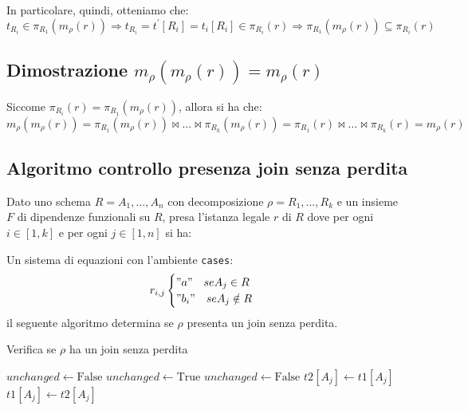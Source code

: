 \documentclass{article}
\begin{document}
In particolare, quindi, otteniamo che:
\[ t_{R_i} \in \pi_{R_1}(m_{\rho}(r)) \Rightarrow t_{R_i} = t^{'}[R_i] = t_i[R_i] \in \pi_{R_i}(r) \Rightarrow \pi_{R_1}(m_{\rho}(r)) \subseteq \pi_{R_i}(r) \]

\subsection{Dimostrazione $m_{\rho}(m_{\rho}(r)) = m_{\rho}(r)$}
Siccome $\pi_{R_i}(r) = \pi_{R_1}(m_{\rho}(r))$, allora si ha che:
\[ m_{\rho}(m_{\rho}(r)) = \pi_{R_1}(m_{\rho}(r)) \bowtie \ldots \bowtie \pi_{R_k}(m_{\rho}(r)) = \pi_{R_1}(r) \bowtie \ldots \bowtie \pi_{R_k}(r) = m_{\rho}(r) \]

\pagebreak

\subsection{Algoritmo controllo presenza join senza perdita}
Dato uno schema $R = A_1, \ldots, A_n$ con decomposizione $\rho = R_1, \ldots, R_k$ e un insieme $F$ di dipendenze funzionali su $R$, presa l'istanza legale $r$ di $R$ dove per ogni $i \in [1, k]$ e per ogni $j \in [1, n]$ si ha:


Un sistema di equazioni con l'ambiente \texttt{cases}:
\[r_{i, j}
\begin{cases}
    "a" \quad se A_j \in R \\
    "b_i" \quad se A_j \notin R
\end{cases}
\]
il seguente algoritmo determina se $\rho$ presenta un join senza perdita.
\begin{algorithm}
  \caption{Verifica se $\rho$ ha un join senza perdita}
  \begin{algorithmic}[1]
          \State $unchanged \gets \text{False}$
              \State $unchanged \gets \text{True}$
                              \State $unchanged \gets \text{False}$
                                      \State $t2[A_j] \gets t1[A_j]$
                                  \Else
                                      \State $t1[A_j] \gets t2[A_j]$
                                  \EndIf
                              \EndFor
                          \EndIf
                      \EndFor
                  \EndFor
              \EndFor
          \EndWhile
                  \State \Return {}
              \EndIf
          \EndFor
          \State \Return {}
      \EndFunction
  \end{algorithmic}
\end{algorithm}
\end{document}
